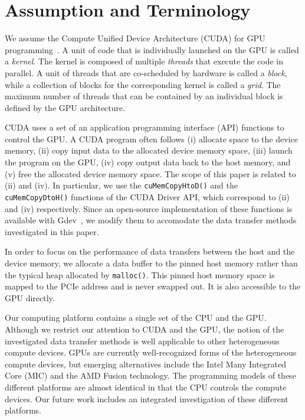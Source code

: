 \section{Assumption and Terminology}
\label{sec:assumption}

We assume the Compute Unified Device Architecture (CUDA) for GPU
programming~\cite{NVIDIA_CUDA}.
A unit of code that is individually launched on the GPU is called
a \textit{kernel}.
The kernel is composed of multiple \textit{threads} that execute the
code in parallel.
A unit of threads that are co-scheduled by hardware is called a
\textit{block}, while a collection of blocks for the corresponding
kernel is called a \textit{grid}.  
The maximum number of threads that can be contained by an individual
block is defined by the GPU architecture.

CUDA uses a set of an application programming interface (API) functions
to control the GPU.
A CUDA program often follows (i) allocate space
to the device memory, (ii) copy input data to the allocated device memory
space, (iii) launch the program on the GPU, (iv) copy output data back
to the host memory, and (v) free the allocated device memory space. 
The scope of this paper is related to (ii) and (iv).
In particular, we use the \texttt{cuMemCopyHtoD()} and the
\texttt{cuMemCopyDtoH()} functions of the CUDA Driver API, which
correspond to (ii) and (iv) respectively.
Since an open-source implementation of these functions is available with
Gdev~\cite{Kato_ATC12}, we modify them to accomodate the data transfer
methods investigated in this paper.

In order to focus on the performance of data transfers between the host
and the device memory, we allocate a data buffer to the pinned host
memory rather than the typical heap allocated by \texttt{malloc()}.
This pinned host memory space is mapped to the PCIe address and is never
swapped out.
It is also accessible to the GPU directly.

Our computing platform contains a single set of the CPU and the GPU.
Although we restrict our attention to CUDA and the GPU, the notion of
the investigated data transfer methods is well applicable to other
heterogeneous compute devices.
GPUs are currently well-recognized forms of the heterogeneous compute
devices, but emerging alternatives include the Intel Many Integrated
Core (MIC) and the AMD Fusion technology.
The programming models of these different platforms are almost identical
in that the CPU controls the compute devices.
Our future work includes an integrated investigation of these different
platforms.
